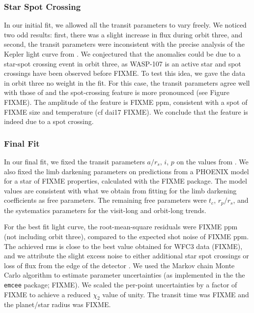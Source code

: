 \documentclass[twocolumn]{aastex61}
\begin{document}
\subsubsection{Star Spot Crossing}
In our initial fit, we allowed all the transit parameters to vary freely. We noticed two odd results: first, there was a slight increase in flux during orbit three, and second, the transit parameters were inconsistent with the precise analysis of the Kepler light curve from \cite{dai17}.  We conjectured that the anomalies could be due to a star-spot crossing event in orbit three, as WASP-107 is an active star and spot crossings have been observed before FIXME. To test this idea, we gave the data in orbit three no weight in the fit. For this case, the transit parameters agree well with those of \cite{dai17} and the spot-crossing feature is more pronounced (see Figure FIXME). The amplitude of the feature is FIXME ppm, consistent with a spot of FIXME size and temperature (cf dai17 FIXME).  We conclude that the feature is indeed due to a spot crossing.

\subsubsection{Final Fit}
In our final fit, we fixed the transit parameters $a/r_s$, $i$, $p$ on the values from \cite{dai17}.  We also fixed the limb darkening parameters on predictions from a PHOENIX model for a star of FIXME properties, calculated with the FIXME package.  The model values are consistent with what we obtain from fitting for the limb darkening coefficients as free parameters. The remaining free parameters were $t_c$, $r_p/r_s$, and the systematics parameters for the visit-long and orbit-long trends.

For the best fit light curve, the root-mean-square residuals were FIXME ppm (not including orbit three), compared to the expected shot noise of FIXME ppm. The achieved rms is close to the best value obtained for WFC3 data (FIXME), and we attribute the slight excess noise to either additional star spot crossings or loss of flux from the edge of the detector \citep[as has been seen for other bright targets;][]{FIXME}. We used the Markov chain Monte Carlo algorithm to estimate parameter uncertainties (as implemented in the the \texttt{emcee} package; FIXME). We scaled the per-point uncertainties by a factor of FIXME to achieve a reduced $\chi_2$ value of unity. The transit time was FIXME and the planet/star radius was FIXME.
\end{document}
